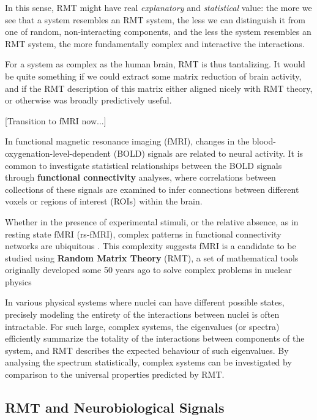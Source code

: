 \documentclass[12pt]{spieman}  %
\begin{document}
\begin{spacing}{2}
In this sense, RMT might have real \textit{explanatory} and \textit{statistical} value: the more we
see that a system resembles an RMT system, the less we can distinguish it from one of random,
non-interacting components, and the less the system resembles an RMT system, the more
fundamentally complex and interactive the interactions.

For a system as complex as the human brain, RMT is thus tantalizing. It would be quite something
if we could extract some matrix reduction of brain activity, and if the RMT description of this
matrix either aligned nicely with RMT theory, or otherwise was broadly predictively useful.

[Transition to fMRI now...]


In functional magnetic resonance imaging (fMRI), changes in the blood-oxygenation-level-dependent
(BOLD) signals are related to neural activity. It is common to investigate statistical relationships
between the BOLD signals through \textbf{functional connectivity} analyses, where correlations between
collections of these signals are examined to infer connections between different voxels or regions
of interest (ROIs) within the brain.

Whether in the presence of experimental stimuli, or the relative absence, as in resting state fMRI (rs-fMRI),
complex patterns in functional connectivity networks are ubiquitous
\cite{bucknerBrainDefaultNetwork2008,foxCoverHumanBrain2005,gonzalez-castilloTaskbasedDynamicFunctional2018,hermundstadStructuralFoundationsRestingstate2013}.
This complexity suggests fMRI is a candidate to be studied using \textbf{Random Matrix Theory} (RMT), a set
of mathematical tools originally developed some 50 years ago to solve complex problems in nuclear
physics \cite{guhrRandommatrixTheoriesQuantum1998a,mehtaRandomMatrices2004}

In various
physical systems where nuclei can have different possible states, precisely modeling the entirety of
the interactions between nuclei is often intractable. For such large, complex systems, the
eigenvalues (or spectra) efficiently summarize the totality of the interactions between components
of the system, and RMT describes the expected behaviour of such eigenvalues. By analysing the
spectrum statistically, complex systems can be investigated by comparison to the universal
properties predicted by RMT.

\subsection{RMT and Neurobiological Signals}


\end{spacing}
\end{document}
